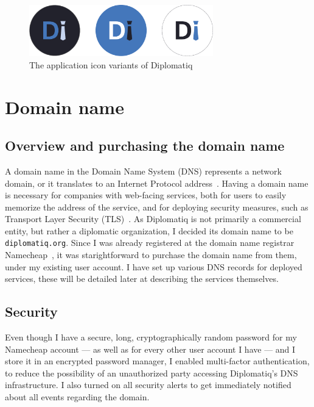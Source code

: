 \begin{figure}[!htb]
    \centering
    \includegraphics[width=8cm]{figures/diplomatiq-app-icons.pdf}
    \caption{The application icon variants of Diplomatiq}
    \label{fig:diplomatiq-app-icons}
\end{figure}

\section{Domain name}

\subsection{Overview and purchasing the domain name}

A domain name in the Domain Name System (DNS) represents a network domain, or it translates to an Internet Protocol address~\cite{rfc1035}. Having a domain name is necessary for companies with web-facing services, both for users to easily memorize the address of the service, and for deploying security measures, such as Transport Layer Security (TLS)~\cite{rfc8446}. As Diplomatiq is not primarily a commercial entity, but rather a diplomatic organization, I decided its domain name to be \lstinline{diplomatiq.org}. Since I was already registered at the domain name registrar Namecheap~\cite{namecheap-website}, it was starightforward to purchase the domain name from them, under my existing user account. I have set up various DNS records for deployed services, these will be detailed later at describing the services themselves.

\subsection{Security}

Even though I have a secure, long, cryptographically random password for my Namecheap account — as well as for every other user account I have — and I store it in an encrypted password manager, I enabled multi-factor authentication, to reduce the possibility of an unauthorized party accessing Diplomatiq's DNS infrastructure. I also turned on all security alerts to get immediately notified about all events regarding the domain.

